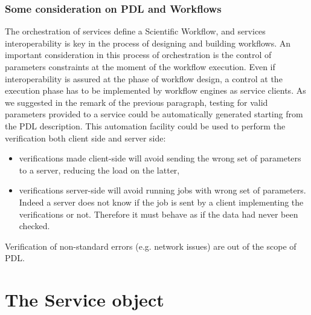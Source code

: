 \documentclass[a4paper,11pt] {ivoa}
\begin{document}
\subsubsection{Some consideration on PDL and Workflows}\label{PDLWF}
The orchestration of services define a Scientific Workflow, and services interoperability is key in the process of designing and building workflows. An important consideration in this process of orchestration is the control of parameters constraints at the moment of the workflow execution. Even if interoperability is assured at the phase of workflow design, a control at the execution phase has to be implemented by workflow engines as service clients. 
As we suggested in the remark of the previous paragraph, testing for valid parameters provided to a service could be automatically generated starting from the PDL description. 
This automation facility could be used to perform the verification both client side and server side:
\begin{itemize}
\item verifications made client-side will avoid sending the wrong set of parameters to a server, reducing the load on the latter,
\item verifications server-side will avoid running jobs with wrong set of parameters. Indeed a server does not know if the job is sent by a client implementing the verifications or not. Therefore it must behave as if the data had never been checked. 
\end{itemize}
Verification of non-standard errors (e.g. network issues) are out of the scope of PDL.

\section{The Service object}\label{par-service}
\end{document}
